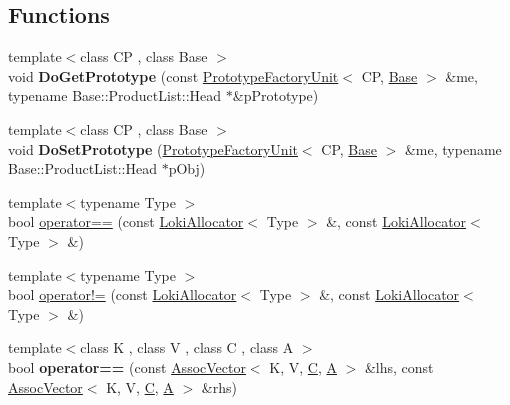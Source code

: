 \subsection*{Functions}
\begin{DoxyCompactItemize}
\item 
\hypertarget{namespaceLoki_aebc4d407b44a8e45873e03e78d5dc907}{}{\footnotesize template$<$class C\+P , class Base $>$ }\\void {\bfseries Do\+Get\+Prototype} (const \hyperlink{classLoki_1_1PrototypeFactoryUnit}{Prototype\+Factory\+Unit}$<$ C\+P, \hyperlink{structBase}{Base} $>$ \&me, typename Base\+::\+Product\+List\+::\+Head $\ast$\&p\+Prototype)\label{namespaceLoki_aebc4d407b44a8e45873e03e78d5dc907}

\item 
\hypertarget{namespaceLoki_a216c254b2992d1003e1182e14e90b9d6}{}{\footnotesize template$<$class C\+P , class Base $>$ }\\void {\bfseries Do\+Set\+Prototype} (\hyperlink{classLoki_1_1PrototypeFactoryUnit}{Prototype\+Factory\+Unit}$<$ C\+P, \hyperlink{structBase}{Base} $>$ \&me, typename Base\+::\+Product\+List\+::\+Head $\ast$p\+Obj)\label{namespaceLoki_a216c254b2992d1003e1182e14e90b9d6}

\item 
{\footnotesize template$<$typename Type $>$ }\\bool \hyperlink{namespaceLoki_ac5ed3f60a0fb3e29effa1f4cd5b834c0}{operator==} (const \hyperlink{classLoki_1_1LokiAllocator}{Loki\+Allocator}$<$ Type $>$ \&, const \hyperlink{classLoki_1_1LokiAllocator}{Loki\+Allocator}$<$ Type $>$ \&)
\item 
{\footnotesize template$<$typename Type $>$ }\\bool \hyperlink{namespaceLoki_a29597928c899c19fedc26a696feb470a}{operator!=} (const \hyperlink{classLoki_1_1LokiAllocator}{Loki\+Allocator}$<$ Type $>$ \&, const \hyperlink{classLoki_1_1LokiAllocator}{Loki\+Allocator}$<$ Type $>$ \&)
\item 
\hypertarget{namespaceLoki_a935c3734691858d4ab91e7c8ac92a756}{}{\footnotesize template$<$class K , class V , class C , class A $>$ }\\bool {\bfseries operator==} (const \hyperlink{classLoki_1_1AssocVector}{Assoc\+Vector}$<$ K, V, \hyperlink{classC}{C}, \hyperlink{structA}{A} $>$ \&lhs, const \hyperlink{classLoki_1_1AssocVector}{Assoc\+Vector}$<$ K, V, \hyperlink{classC}{C}, \hyperlink{structA}{A} $>$ \&rhs)\label{namespaceLoki_a935c3734691858d4ab91e7c8ac92a756}


\end{DoxyCompactItemize}

